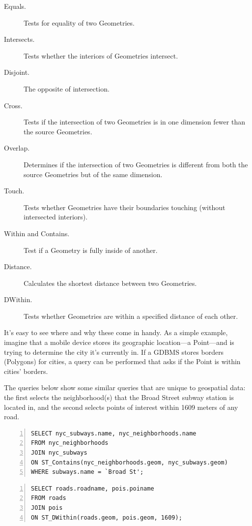 \begin{description}
  \item[Equals.] Tests for equality of two Geometries.
  \item[Intersects.] Tests whether the interiors of Geometries intersect.
  \item[Disjoint.] The opposite of intersection.
  \item[Cross.] Tests if the intersection of two Geometries is in one dimension fewer than the source Geometries.
  \item[Overlap.] Determines if the intersection of two Geometries is different from both the source Geometries but of the same dimension.
  \item[Touch.] Tests whether Geometries have their boundaries touching (without intersected interiors).
  \item[Within and Contains.] Test if a Geometry is fully inside of another.
  \item[Distance.] Calculates the shortest distance between two Geometries.
  \item[DWithin.] Tests whether Geometries are within a specified distance of each other.
\end{description}

It's easy to see where and why these come in handy. As a simple example, imagine that a mobile device stores its geographic location---a Point---and is trying to determine the city it's currently in. If a GDBMS stores borders (Polygons) for cities, a query can be performed that asks if the Point is within cities' borders.

The queries below show some similar queries that are unique to geospatial data: the first selects the neighborhood(s) that the Broad Street subway station is located in, and the second selects points of interest within 1609 meters of any road.

\begin{Verbatim}[samepage=true,baselinestretch=1,numbers=left,xleftmargin=12mm]
SELECT nyc_subways.name, nyc_neighborhoods.name
FROM nyc_neighborhoods
JOIN nyc_subways
ON ST_Contains(nyc_neighborhoods.geom, nyc_subways.geom)
WHERE subways.name = `Broad St';
\end{Verbatim}

\begin{Verbatim}[samepage=true,baselinestretch=1,numbers=left,xleftmargin=12mm]
SELECT roads.roadname, pois.poiname
FROM roads
JOIN pois 
ON ST_DWithin(roads.geom, pois.geom, 1609);
\end{Verbatim}

